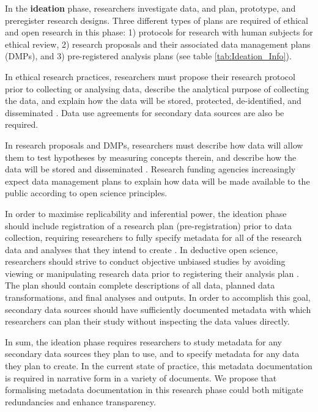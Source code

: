 \documentclass{isprs} %
\begin{document}
In the \textbf{ideation} phase, researchers investigate data, and plan, prototype, and preregister research designs.
Three different types of plans are required of ethical and open research in this phase: 1) protocols for research with human subjects for ethical review, 2) research proposals and their associated data management plans (DMPs), and 3) pre-registered analysis plans (see table \ref{tab:Ideation_Info}).

In ethical research practices, researchers must propose their research protocol prior to collecting or analysing data, describe the analytical purpose of collecting the data, and explain how the data will be stored, protected, de-identified, and disseminated \citep{DHEW1978}.
Data use agreements for secondary data sources are also be required.

In research proposals and DMPs, researchers must describe how data will allow them to test hypotheses by measuring concepts therein, and describe how the data will be stored and disseminated \citep{NSF2021}.
Research funding agencies increasingly expect data management plans to explain how data will be made available to the public according to open science principles. 

In order to maximise replicability and inferential power, the ideation phase should include registration of a research plan (pre-registration) prior to data collection, requiring researchers to fully specify metadata for all of the research data and analyses that they intend to create \citep{Nosek2018}.
In deductive open science, researchers should strive to conduct objective unbiased studies by avoiding viewing or manipulating research data prior to registering their analysis plan \cite{Nosek2018}.
The plan should contain complete descriptions of all data, planned data transformations, and final analyses and outputs.
In order to accomplish this goal, secondary data sources should have sufficiently documented metadata with which researchers can plan their study without inspecting the data values directly.

In sum, the ideation phase requires researchers to study metadata for any secondary data sources they plan to use, and to specify metadata for any data they plan to create.
In the current state of practice, this metadata documentation is required in narrative form in a variety of documents.
We propose that formalising metadata documentation in this research phase could both mitigate redundancies and enhance transparency.
\end{document}
